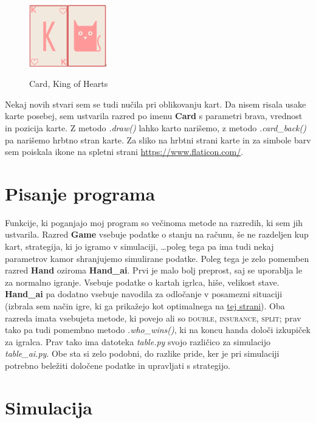 \documentclass[a4paper, 16pt]{article}
\begin{document}
\begin{figure}
  \begin{center}
    \includegraphics[width=0.3\textwidth]{cards.png} \,%
  \end{center}
  \caption{Card, King of Hearts}
\end{figure}
Nekaj novih stvari sem se tudi nučila pri oblikovanju kart. Da nisem risala usake karte posebej, sem ustvarila razred po imenu \textbf{Card} s parametri brava, vrednost in pozicija karte. Z metodo \textit{.draw()} lahko karto narišemo, z metodo \textit{.card\_back()} pa narišemo hrbtno stran karte. Za sliko na hrbtni strani karte in za simbole barv sem poiskala ikone na spletni strani \url{https://www.flaticon.com/}.


\section{Pisanje programa}

Funkcije, ki poganjajo moj program so večinoma metode na razredih, ki sem jih ustvarila. Razred \textbf{Game} vsebuje podatke o stanju na računu, še ne razdeljen kup kart, strategija, ki jo igramo v simulaciji, \dots poleg tega pa ima tudi nekaj parametrov kamor shranjujemo simulirane podatke. Poleg tega je zelo pomemben razred \textbf{Hand} oziroma \textbf{Hand\_ai}. Prvi je malo bolj preprost, saj se uporablja le za normalno igranje. Vsebuje podatke o kartah igrlca, hiše, velikost stave. \textbf{Hand\_ai} pa dodatno vsebuje navodila za odločanje v posamezni situaciji (izbrala sem način igre, ki ga prikažejo kot optimalnega na \href{https://www.blackjackapprenticeship.com/blackjack-strategy-charts/}{tej strani}). Oba razreda imata vsebujeta metode, ki povejo ali so \textsc{double}, \textsc{insurance}, \textsc{split}; prav tako pa tudi pomembno metodo \textit{.who\_wins()}, ki na koncu handa določi izkupiček za igralca.
Prav tako ima datoteka \textit{table.py} svojo različico za simulacijo \textit{table\_ai.py}. Obe sta si zelo podobni, do razlike pride, ker je pri simulaciji potrebno beležiti določene podatke in upravljati s strategijo.

\section{Simulacija}
\end{document}
